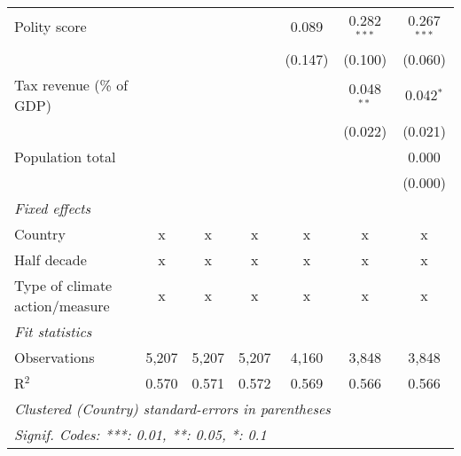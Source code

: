 \begin{tabular}{lcccccc}
   Polity score                                                    &         &         &                & 0.089          & 0.282$^{***}$  & 0.267$^{***}$\\   
                                                                   &         &         &                & (0.147)        & (0.100)        & (0.060)\\   
   Tax revenue (\% of GDP)                                         &         &         &                &                & 0.048$^{**}$   & 0.042$^{*}$\\   
                                                                   &         &         &                &                & (0.022)        & (0.021)\\   
   Population total                                                &         &         &                &                &                & 0.000\\   
                                                                   &         &         &                &                &                & (0.000)\\   
   \emph{Fixed effects}\\
   Country                                                         & x       & x       & x              & x              & x              & x\\  
   Half decade                                                     & x       & x       & x              & x              & x              & x\\  
   Type of climate action/measure                                  & x       & x       & x              & x              & x              & x\\  
   \midrule \emph{Fit statistics}\\
   Observations                                                    & 5,207   & 5,207   & 5,207          & 4,160          & 3,848          & 3,848\\  
   R$^2$                                                           & 0.570   & 0.571   & 0.572          & 0.569          & 0.566          & 0.566\\  
   \midrule
   \multicolumn{7}{l}{\emph{Clustered (Country) standard-errors in parentheses}}\\
   \multicolumn{7}{l}{\emph{Signif. Codes: ***: 0.01, **: 0.05, *: 0.1}}\\
\end{tabular}
\par\endgroup


